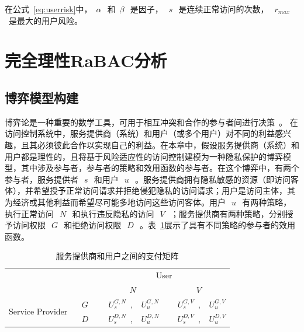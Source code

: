在公式~\ref{eq:userrisk}中，~$\alpha~$~和~$\beta~$~是因子，~$~s~$~是连续正常访问的次数，~$~r_{max}$~是最大的用户风险。

\section{完全理性RaBAC分析}
\label{sec:gamemodel}

\subsection{博弈模型构建}

博弈论是一种重要的数学工具，可用于相互冲突和合作的参与者间进行决策~\cite{owen2001}。
在访问控制系统中，服务提供商（系统）和用户（或多个用户）对不同的利益感兴趣，且其必须彼此合作以实现自己的利益。在本章中，假设服务提供商（系统）和用户都是理性的，且将基于风险适应性的访问控制建模为一种隐私保护的博弈模型，其中涉及参与者，参与者的策略和效用函数的参与者。在这个博弈中，有两个参与者，服务提供者~$~s~$~和用户~$~u~$~。服务提供商拥有隐私敏感的资源（即访问客体），并希望授予正常访问请求并拒绝侵犯隐私的访问请求；用户是访问主体，其为经济或其他利益而希望尽可能多地访问这些访问客体。用户~$~u~$~有两种策略，执行正常访问~$~N~$~和执行违反隐私的访问~$~V~$~；服务提供商有两种策略，分别授予访问权限~$~G~$~和拒绝访问权限~$~D~$~。表~\ref{tab:payoff}展示了具有不同策略的参与者的效用函数。

\begin{table}[htb]
	\caption{服务提供商和用户之间的支付矩阵}\label{tab:payoff}
	\centering 
	\begin{tabular}{cccc}
		\toprule
		\multicolumn{2}{c}{\multirow{2}{*}{}} & \multicolumn{2}{c}{User} \\
		\cline{3-4}
		& & ~$~N~$~ & ~$~V~$~ \\	
		\hline
		\multirow{2}{*}{Service Provider} & ~$~G~$~ &~$~U_s^{G,N}$~, ~$~U_u^{G,N}$~ & ~$~U_s^{G,V}$~, ~$~U_u^{G,V}$\\
		\cline{2-4}
		& ~$~D~$~ & ~$~U_s^{D,N}$~, ~$~U_u^{D,N}$~ & ~$~U_s^{D,V}$~, ~$~U_u^{D,V}$\\
		\toprule
	\end{tabular}
\end{table}



